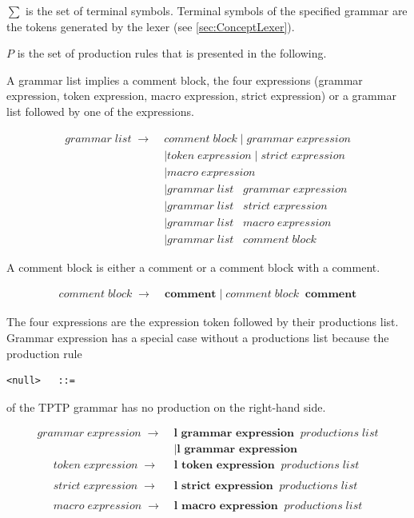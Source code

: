 $\sum$ is the set of terminal symbols. Terminal symbols of the specified grammar are the tokens generated by the lexer (see \ref{sec:ConceptLexer}).

$P$ is the set of production rules that is presented in the following. 

A grammar list implies a comment block, the four expressions (grammar expression, token expression, macro expression, strict expression) or a grammar list followed by one of the expressions.

\begin{align*}
	grammar\;list\; \rightarrow\; &comment\;block
	     		\mid grammar\;expression  \\
			   &\mid token\;expression
                \mid strict\;expression\\
               &\mid macro\;expression \\
               &\mid grammar\;list\;\;\;grammar\;expression\\
               &\mid grammar\;list\;\;\;strict\;expression \\
               &\mid grammar\;list\;\;\;macro\;expression \\
               &\mid grammar\;list\;\;\;comment\;block               
\end{align*}

A comment block is either a comment or a comment block with a comment.

\begin{align*}
    comment\;block\; \rightarrow\; &\textbf{comment}
                \mid comment\;block\;\;\textbf{comment}
\end{align*}

The four expressions are the expression token followed by their productions list. Grammar expression has a special case without a productions list because the production rule
\begin{verbatim}
<null>   ::= 
\end{verbatim} of the \ac{TPTP} grammar has no production on the right-hand side. 

\begin{align*}
	grammar\;expression\; \rightarrow\; &\textbf{l grammar expression}\;\;productions\;list \\ 
               &\mid \textbf{l grammar expression} 
\end{align*}
\begin{align*}        
	token\;expression\; \rightarrow\; &\textbf{l token expression} \;\;productions\;list \\ \\
	strict\;expression\; \rightarrow\; &\textbf{l strict expression} \;\;productions\;list \\ \\
	macro\;expression\; \rightarrow\; &\textbf{l macro expression} \;\;productions\;list 
\end{align*}

